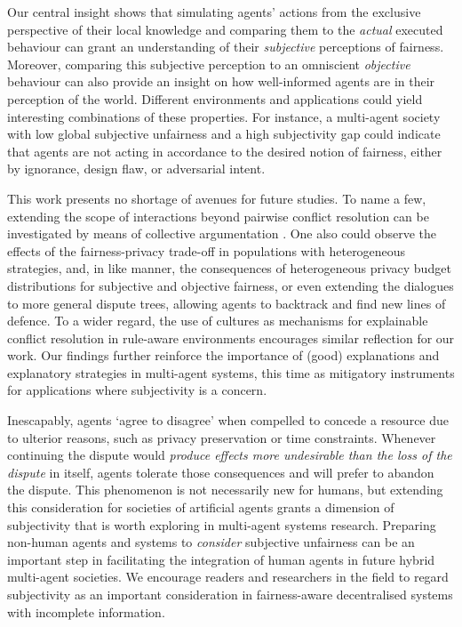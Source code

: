 \documentclass[acmsmall]{custom-arxiv}  %
\begin{document}
Our central insight shows that simulating agents' actions from the exclusive perspective of their local knowledge and comparing them to the \textit{actual} executed behaviour can grant an understanding of their \textit{subjective} perceptions of fairness. Moreover, comparing this subjective perception to an omniscient \textit{objective} behaviour can also provide an insight on how well-informed agents are in their perception of the world. Different environments and applications could yield interesting combinations of these properties. For instance, a multi-agent society with low global subjective unfairness and a high subjectivity gap could indicate that agents are not acting in accordance to the desired notion of fairness, either by ignorance, design flaw, or adversarial intent.

This work presents no shortage of avenues for future studies. To name a few, extending the scope of interactions beyond pairwise conflict resolution can be investigated by means of collective argumentation \citep{Bodanza2017CollectiveFrameworks}. One also could observe the effects of the fairness-privacy trade-off in populations with heterogeneous strategies, and, in like manner, the consequences of heterogeneous privacy budget distributions for subjective and objective fairness, or even extending the dialogues to more general dispute trees, allowing agents to backtrack and find new lines of defence. To a wider regard, the use of cultures as mechanisms for explainable conflict resolution in rule-aware environments encourages similar reflection for our work. Our findings further reinforce the importance of (good) explanations and explanatory strategies in multi-agent systems, this time as mitigatory instruments for applications where subjectivity is a concern.

Inescapably, agents `agree to disagree' when compelled to concede a resource due to ulterior reasons, such as privacy preservation or time constraints. Whenever continuing the dispute would \textit{produce effects more undesirable than the loss of the dispute} in itself, agents tolerate those consequences and will prefer to abandon the dispute. This phenomenon is not necessarily new for humans, but extending this consideration for societies of artificial agents grants a dimension of subjectivity that is worth exploring in multi-agent systems research. Preparing non-human agents and systems to \textit{consider} subjective unfairness can be an important step in facilitating the integration of human agents in future hybrid multi-agent societies. We encourage readers and researchers in the field to regard subjectivity as an important consideration in fairness-aware decentralised systems with incomplete information.
\end{document}
